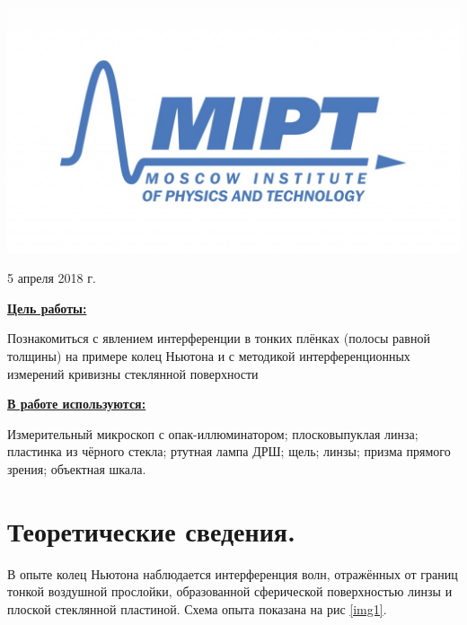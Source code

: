 \documentclass[a4paper, 12pt, twoside]{article}
\newenvironment{bottompar}{\par\vspace*{\fill}}{\clearpage}
\begin{document}
\begin{titlepage}
		\begin{bottompar}
			\begin{center}
				\includegraphics[width = 80 mm]{logo.jpg}
			\end{center}
			{\large 5 апреля 2018 г.}
			
		\end{bottompar}
		\vfill %
		
	\end{titlepage}
	
	{\Large \uline { \textbf  {Цель работы:}}}
	
	\vspace{2mm}
	Познакомиться с явлением интерференции в тонких плёнках (полосы равной толщины) на примере колец Ньютона и с методикой интерференционных измерений кривизны стеклянной поверхности
	\vspace{\baselineskip}
	
	{\Large \uline { \textbf  {В работе используются:}}}
	
	\vspace{2mm}
	
	Измерительный микроскоп с опак-иллюминатором; плосковыпуклая линза; пластинка из чёрного стекла; ртутная лампа ДРШ; щель; линзы; призма прямого зрения; объектная шкала.
	
	\section{Теоретические сведения.}
	
	В опыте колец Ньютона наблюдается интерференция волн, отражённых от границ тонкой воздушной прослойки, образованной сферической поверхностью линзы и плоской стеклянной пластиной. Схема опыта показана на рис \ref{img1}.
	
\end{document}

